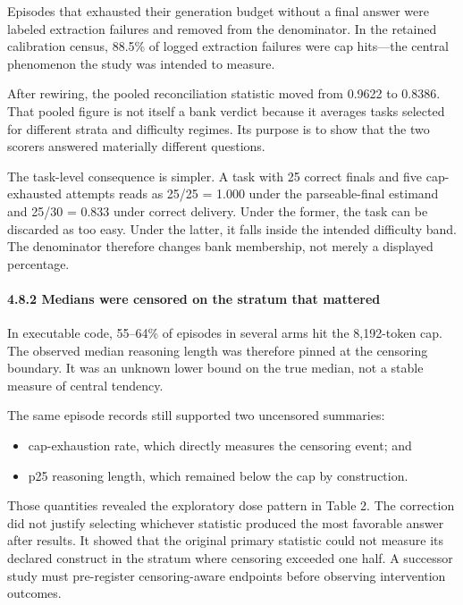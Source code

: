\documentclass[
  9pt,
  letterpaper,
]{article}
\providecommand{\tightlist}{%
  \setlength{\itemsep}{0pt}\setlength{\parskip}{0pt}}
\begin{document}
Episodes that exhausted their generation budget without a final answer
were labeled extraction failures and removed from the denominator. In
the retained calibration census, 88.5\% of logged extraction failures
were cap hits---the central phenomenon the study was intended to
measure.

After rewiring, the pooled reconciliation statistic moved from 0.9622 to
0.8386. That pooled figure is not itself a bank verdict because it
averages tasks selected for different strata and difficulty regimes. Its
purpose is to show that the two scorers answered materially different
questions.

The task-level consequence is simpler. A task with 25 correct finals and
five cap-exhausted attempts reads as 25/25 = 1.000 under the
parseable-final estimand and 25/30 = 0.833 under correct delivery. Under
the former, the task can be discarded as too easy. Under the latter, it
falls inside the intended difficulty band. The denominator therefore
changes bank membership, not merely a displayed percentage.

\hypertarget{482-medians-were-censored-on-the-stratum-that-mattered}{%
\paragraph{4.8.2 Medians were censored on the stratum that
mattered}\label{482-medians-were-censored-on-the-stratum-that-mattered}}

In executable code, 55--64\% of episodes in several arms hit the
8,192-token cap. The observed median reasoning length was therefore
pinned at the censoring boundary. It was an unknown lower bound on the
true median, not a stable measure of central tendency.

The same episode records still supported two uncensored summaries:

\begin{itemize}
\tightlist
\item
  cap-exhaustion rate, which directly measures the censoring event; and
\item
  p25 reasoning length, which remained below the cap by construction.
\end{itemize}

Those quantities revealed the exploratory dose pattern in Table 2. The
correction did not justify selecting whichever statistic produced the
most favorable answer after results. It showed that the original primary
statistic could not measure its declared construct in the stratum where
censoring exceeded one half. A successor study must pre-register
censoring-aware endpoints before observing intervention outcomes.
\end{document}
